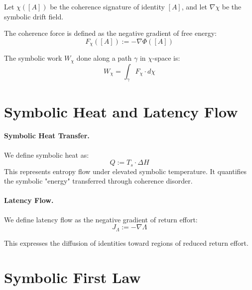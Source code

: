 Let $\chi([A])$ be the coherence signature of identity $[A]$, and let $\nabla\chi$ be the symbolic drift field.

\begin{definition}
The coherence force is defined as the negative gradient of free energy:
\begin{equation} \label{eq:coherence-force}
F_\chi([A]) := -\nabla \Phi([A])
\end{equation}
\end{definition}

\begin{definition}
The symbolic work $W_\chi$ done along a path $\gamma$ in $\chi$-space is:
\begin{equation} \label{eq:symbolic-work}
W_\chi = \int_\gamma F_\chi \cdot d\chi
\end{equation}
\end{definition}

\section{Symbolic Heat and Latency Flow} \label{symbolic-heat-and-latency-flow}

\paragraph{Symbolic Heat Transfer.}
We define symbolic heat as:
\begin{equation} \label{eq:symbolic-heat}
Q := T_s \cdot \Delta H
\end{equation}
This represents entropy flow under elevated symbolic temperature. It quantifies the symbolic "energy" transferred through coherence disorder.

\paragraph{Latency Flow.}
We define latency flow as the negative gradient of return effort:
\begin{equation} \label{eq:latency-flow}
J_\Lambda := -\nabla \Lambda
\end{equation}

This expresses the diffusion of identities toward regions of reduced return effort.

\section{Symbolic First Law} \label{symbolic-first-law}


